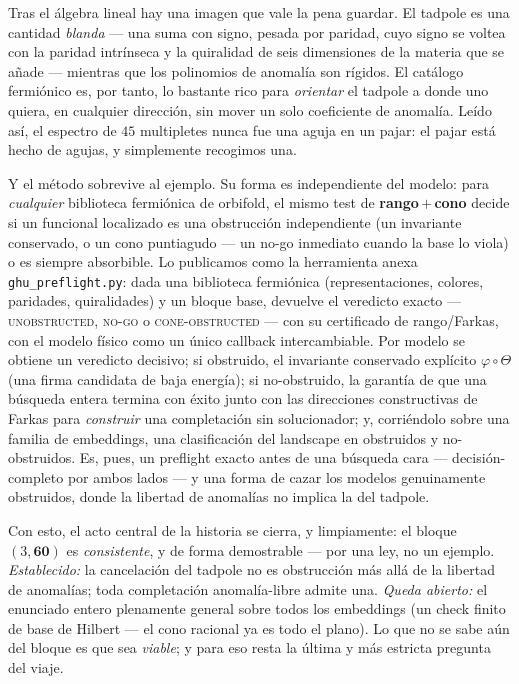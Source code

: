 \documentclass[11pt,a4paper]{article}
\begin{document}
Tras el \'algebra lineal hay una imagen que vale la pena guardar. El tadpole es una
cantidad \emph{blanda} --- una suma con signo, pesada por paridad, cuyo signo se voltea con
la paridad intr\'inseca y la quiralidad de seis dimensiones de la materia que se a\~nade ---
mientras que los polinomios de anomal\'ia son r\'igidos. El cat\'alogo fermi\'onico es, por
tanto, lo bastante rico para \emph{orientar} el tadpole a donde uno quiera, en cualquier
direcci\'on, sin mover un solo coeficiente de anomal\'ia. Le\'ido as\'i, el espectro de
$45$ multipletes nunca fue una aguja en un pajar: el pajar est\'a hecho de agujas, y
simplemente recogimos una.

Y el m\'etodo sobrevive al ejemplo. Su forma es independiente del modelo: para
\emph{cualquier} biblioteca fermi\'onica de orbifold, el mismo test de
\textbf{rango\,$+$\,cono} decide si un funcional localizado es una obstrucci\'on
independiente (un invariante conservado, o un cono puntiagudo --- un no-go inmediato cuando
la base lo viola) o es siempre absorbible. Lo publicamos como la herramienta anexa
\texttt{ghu\_preflight.py}: dada una biblioteca fermi\'onica (representaciones, colores,
paridades, quiralidades) y un bloque base, devuelve el veredicto exacto ---
\textsc{unobstructed}, \textsc{no-go} o \textsc{cone-obstructed} --- con su certificado de
rango/Farkas, con el modelo f\'isico como un \'unico callback intercambiable. Por modelo se
obtiene un veredicto decisivo; si obstruido, el invariante conservado expl\'icito
$\varphi\circ\Theta$ (una firma candidata de baja energ\'ia); si no-obstruido, la
garant\'ia de que una b\'usqueda entera termina con \'exito junto con las direcciones
constructivas de Farkas para \emph{construir} una completaci\'on sin solucionador; y,
corri\'endolo sobre una familia de embeddings, una clasificaci\'on del landscape en
obstruidos y no-obstruidos. Es, pues, un preflight exacto antes de una b\'usqueda cara ---
decisi\'on-completo por ambos lados --- y una forma de cazar los modelos genuinamente
obstruidos, donde la libertad de anomal\'ias no implica la del tadpole.

Con esto, el acto central de la historia se cierra, y limpiamente: el bloque
$(3,\mathbf{60})$ es \emph{consistente}, y de forma demostrable --- por una ley, no un
ejemplo. \emph{Establecido:} la cancelaci\'on del tadpole no es obstrucci\'on m\'as all\'a
de la libertad de anomal\'ias; toda completaci\'on anomal\'ia-libre admite una.
\emph{Queda abierto:} el enunciado entero plenamente general sobre todos los embeddings (un
check finito de base de Hilbert --- el cono racional ya es todo el plano). Lo que no se sabe
a\'un del bloque es que sea \emph{viable}; y para eso resta la \'ultima y m\'as estricta
pregunta del viaje.
\end{document}
